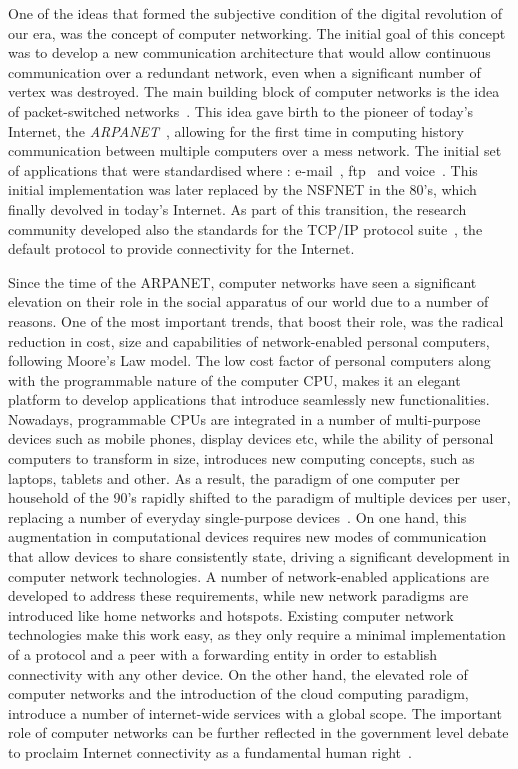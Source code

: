 One of the ideas that formed the subjective condition of the digital revolution
of our era, was the concept of computer networking. The initial goal of this
concept was to develop a new communication architecture that would allow
continuous communication over a redundant network, even when a significant
number of vertex was destroyed.  The main building block of computer networks is
the idea of packet-switched networks~\cite{Licklider1963}.  This idea gave birth
to the pioneer of today's Internet, the {\it ARPANET}~\cite{Mills:1987tt},
allowing for the first time in computing history communication between multiple
computers over a mess network. The initial set of applications that were
standardised where : e-mail~\cite{RFC0561}, ftp~\cite{RFC0354} and
voice~\cite{RFC0741}. This initial implementation was later replaced by the
NSFNET in the 80's, which finally devolved in today's Internet.
As part of this transition, the research community developed also the standards
for the TCP/IP protocol suite~\cite{Clark:1988}, the default protocol to provide
connectivity for the Internet.

Since the time of the ARPANET, computer networks have seen a significant
elevation on their role in the social apparatus of our world due to a number of
reasons. One of the most important trends, that boost their role, was the
radical reduction in cost, size and capabilities of network-enabled personal
computers, following Moore's Law model. The low cost factor of personal
computers along with the programmable nature of
the computer CPU, makes it an elegant platform to develop applications that
introduce seamlessly new functionalities. Nowadays, programmable CPUs are
integrated in a number of multi-purpose devices such as mobile phones, display
devices etc, while the ability of personal computers to transform in size,
introduces new computing concepts, such as laptops, tablets and other.
As a result, the paradigm of one computer per household of the 90's rapidly
shifted to the paradigm of multiple devices per user, replacing a number of
everyday single-purpose devices~\cite{Dholakia:2006vn}.  On one hand, this
augmentation in computational devices requires new modes of communication that
allow devices to share consistently state, driving a significant development in
computer network technologies. A number of network-enabled applications are
developed to address these requirements, while new network paradigms are
introduced like home networks and hotspots. Existing computer network
technologies make this work easy, as they only require a minimal implementation
of a protocol and a peer with a forwarding entity in order to establish
connectivity with any other device. On the other hand, the elevated role
of computer networks and the introduction of the cloud computing paradigm,
introduce a number of internet-wide services with a global scope. 
The important role of computer
networks can be further reflected in the government level debate to proclaim
Internet connectivity as a fundamental human right~\cite{klang2005human}.

